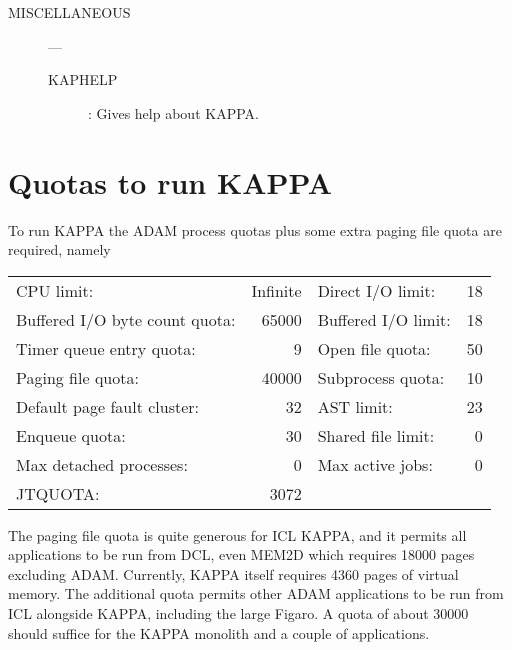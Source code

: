 {\begin{small}
\begin{description}
\item [MISCELLANEOUS] ---
\begin {description}
\begin {description}
\item [KAPHELP]:
 Gives help about {\small KAPPA}.
\end {description}
\end {description}
\end {description}
\end{small}

\section{Quotas to run KAPPA}
\label{ap:quotas}
To run {\small KAPPA} the {\small ADAM} process quotas plus some extra paging file quota
are required, namely \mbox{}
\begin{tabular}[c]{lrlr}
\\
\hspace{4ex} CPU limit: & Infinite & \hspace{4ex} Direct I/O limit: & 18\\
\hspace{4ex} Buffered I/O byte count quota: & 65000 & \hspace{4ex} Buffered I/O limit: & 18\\
\hspace{4ex} Timer queue entry quota: & 9 & \hspace{4ex} Open file quota: & 50\\
\hspace{4ex} Paging file quota: & 40000 & \hspace{4ex} Subprocess quota: & 10\\
\hspace{4ex} Default page fault cluster: & 32 & \hspace{4ex} AST limit: & 23\\
\hspace{4ex} Enqueue quota: & 30 & \hspace{4ex} Shared file limit: & 0\\
\hspace{4ex} Max detached processes: & 0 & \hspace{4ex} Max active jobs: & 0\\
\hspace{4ex} JTQUOTA: & 3072 & & \\
\end{tabular}

The paging file quota is quite generous for {\small ICL} {\small KAPPA},
and it permits all applications to be run from DCL, even MEM2D which
requires 18000 pages excluding {\small ADAM}. Currently, {\small KAPPA}
itself requires 4360 pages of virtual memory. The additional quota
permits other {\small ADAM} applications to be run from {\small ICL}
alongside {\small KAPPA}, including the large {\small Figaro}. A quota
of about 30000 should suffice for the {\small KAPPA} monolith and a
couple of applications.

}

